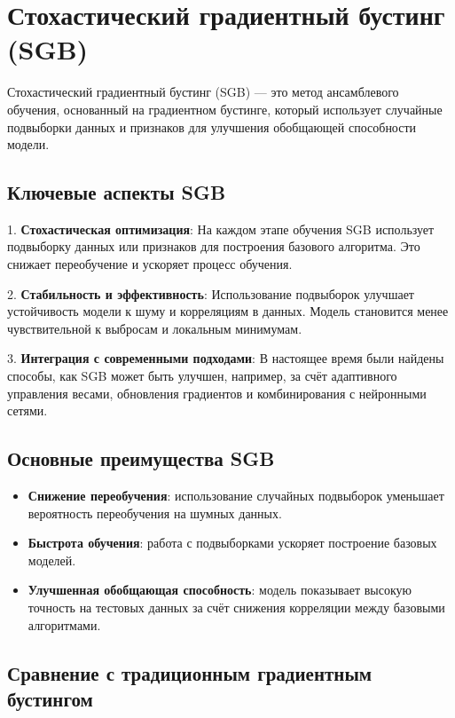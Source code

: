 


\section{Стохастический градиентный бустинг (SGB)}

Стохастический градиентный бустинг (SGB) — это метод ансамблевого обучения, основанный на градиентном бустинге, который использует случайные подвыборки данных и признаков для улучшения обобщающей способности модели. 

\subsection{Ключевые аспекты SGB}

1. \textbf{Стохастическая оптимизация}:
   На каждом этапе обучения SGB использует подвыборку данных или признаков для построения базового алгоритма. Это снижает переобучение и ускоряет процесс обучения.

2. \textbf{Стабильность и эффективность}:
   Использование подвыборок улучшает устойчивость модели к шуму и корреляциям в данных. Модель становится менее чувствительной к выбросам и локальным минимумам.

3. \textbf{Интеграция с современными подходами}:
   В настоящее время были найдены способы, как SGB может быть улучшен, например, за счёт адаптивного управления весами, обновления градиентов и комбинирования с нейронными сетями.

\subsection{Основные преимущества SGB}

\begin{itemize}
    \item \textbf{Снижение переобучения}: использование случайных подвыборок уменьшает вероятность переобучения на шумных данных.
    \item \textbf{Быстрота обучения}: работа с подвыборками ускоряет построение базовых моделей.
    \item \textbf{Улучшенная обобщающая способность}: модель показывает высокую точность на тестовых данных за счёт снижения корреляции между базовыми алгоритмами.
\end{itemize}

\subsection{Сравнение с традиционным градиентным бустингом}

